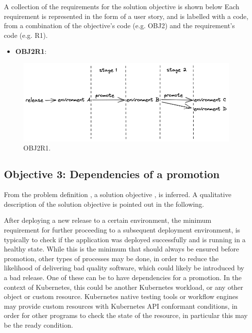 A collection of the requirements for the solution objective is shown below
Each requirement is represented in the form of a user story,
and is labelled with a code, from a combination of the
objective's code (e.g. OBJ2) and the requirement's code (e.g. R1).

\begin{itemize}
	\item \textbf{OBJ2R1}: 
\end{itemize}

\begin{figure}[h]
	\centering
	\includegraphics[width=1.00\linewidth]{assets/OBJ2R1.png}
	\caption{OBJ2R1.
	}
	\label{fig:OBJ2R1}	
\end{figure}

\subsection{Objective 3: Dependencies of a promotion}
\label{objective3}

From the problem definition
\textbf{},
a solution objective
\textbf{},
is inferred.
A qualitative description of the solution objective
is pointed out in the following.

After deploying a new release to a certain environment,
the minimum requirement for further proceeding to a subsequent deployment environment,
is typically to check if the application was deployed successfully and is running in a healthy state.
While this is the minimum that should always be ensured before promotion,
other types of processes may be done, in order to reduce the likelihood of delivering bad quality software,
which could likely be introduced by a bad release.
One of these can be to have dependencies for a promotion.
In the context of Kubernetes, this could be another Kubernetes workload, or any other object or custom resource.
Kubernetes native testing tools or workflow engines may provide custom resources with Kubernetes API conformant
conditions, in order for other programs to check the state of the resource, in particular this may be the ready condition.


